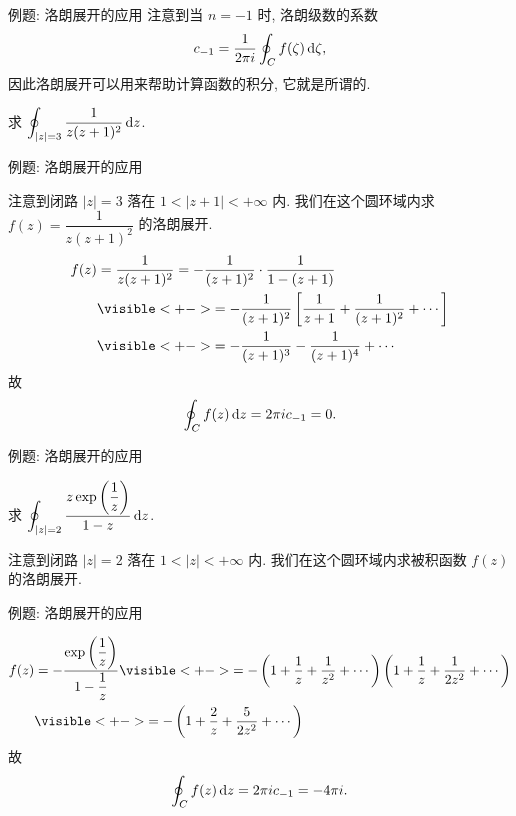 \begin{frame}{例题: 洛朗展开的应用}
\onslide<+->
注意到当 $n=-1$ 时, 洛朗级数的系数
\[c_{-1}=\frac1{2\pi i}\oint_C f(\zeta)\,\mathrm{d}\zeta,\]
\onslide<+->
因此洛朗展开可以用来帮助计算函数的积分,
\onslide<+->
它就是所谓的.
\begin{example}
求 $\displaystyle\oint_{|z|=3}\frac1{z(z+1)^2}\,\mathrm{d} z$.
\end{example}
\end{frame}


\begin{frame}{例题: 洛朗展开的应用}
\begin{solution}
注意到闭路 $|z|=3$ 落在 $1<|z+1|<+\infty$ 内.
\onslide<+->
我们在这个圆环域内求 $f(z)=\dfrac1{z(z+1)^2}$ 的洛朗展开.
\onslide<+->
\vspace{-\baselineskip}
\begin{align*}
f(z)&=\frac1{z(z+1)^2}=-\frac1{(z+1)^2}\cdot\frac1{1-(z+1)}\\
&\visible<+->{=-\frac1{(z+1)^2}\left[\frac1{z+1}+\frac1{(z+1)^2}+\cdots\right]}\\
&\visible<+->{=-\frac1{(z+1)^3}-\frac1{(z+1)^4}+\cdots}
\end{align*}
\onslide<+->
故
\[\oint_Cf(z)\,\mathrm{d} z=2\pi i c_{-1}=0.\]
\end{solution}
\end{frame}


\begin{frame}{例题: 洛朗展开的应用}
\begin{example}
求 $\displaystyle\oint_{|z|=2} \frac{z\exp\left(\dfrac1z\right)}{1-z}\,\mathrm{d} z$.
\end{example}
\begin{solution}
注意到闭路 $|z|=2$ 落在 $1<|z|<+\infty$ 内.
\onslide<+->
我们在这个圆环域内求被积函数 $f(z)$ 的洛朗展开.
\end{solution}
\end{frame}


\begin{frame}{例题: 洛朗展开的应用}
\begin{solutionc}
\begin{align*}
f(z)&=-\frac{\exp\left(\dfrac1z\right)}{1-\dfrac1z}
\visible<+->{=-\left(1+\frac1z+\frac1{z^2}+\cdots\right)\left(1+\frac1z+\frac1{2z^2}+\cdots\right)}\\
&\visible<+->{=-\left(1+\frac2z+\frac5{2z^2}+\cdots\right)}\end{align*}
\onslide<+->
故
\[\oint_Cf(z)\,\mathrm{d} z=2\pi i c_{-1}=-4\pi i.\]
\end{solutionc}
\end{frame}

